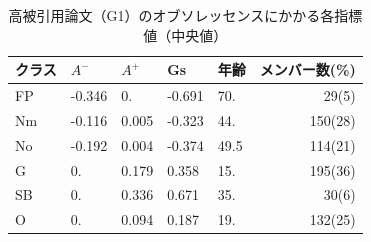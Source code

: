 \begin{table}
\begin{center}
\caption{高被引用論文（G1）のオブソレッセンスにかかる各指標値（中央値）} \label{tab:obsindex}
\begin{tabular}{lllllr}
クラス & $A^-$ & $A^+$ & Gs & 年齢 & メンバー数(\%)\\
\hline
FP & -0.346 & 0. & -0.691 & 70. & 29(5) \\
Nm & -0.116 & 0.005 & -0.323 & 44. & 150(28) \\
No & -0.192 & 0.004 & -0.374 & 49.5 & 114(21) \\
G & 0. & 0.179 & 0.358 & 15. & 195(36) \\
SB & 0. & 0.336 & 0.671 & 35. & 30(6) \\
O & 0. & 0.094 & 0.187 & 19. & 132(25) \\
\end{tabular}
\end{center}
\end{table}
